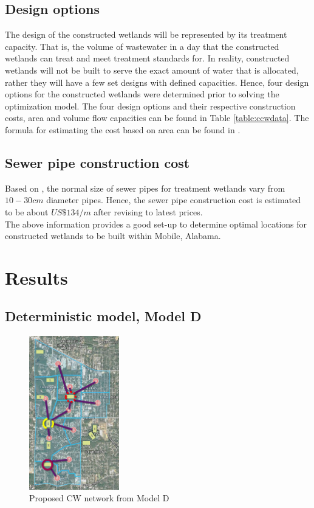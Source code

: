 \documentclass[preprint,12pt,authoryear]{elsarticle}
\begin{document}
\subsection{Design options} 
The design of the constructed wetlands will be represented by its treatment capacity. That is, the volume of wastewater in a day that the constructed wetlands can treat and meet treatment standards for. In reality, constructed wetlands will not be built to serve the exact amount of water that is allocated, rather they will have a few set designs with defined capacities. Hence, four design options for the constructed wetlands were determined prior to solving the optimization model. The four design options and their respective construction costs, area and volume flow capacities can be found in Table \ref{table:ccwdata}. The formula for estimating the cost based on area can be found in \cite{kadlec2009}.

\subsection{Sewer pipe construction cost} 
Based on \cite{kadlec2009}, the normal size of sewer pipes for treatment wetlands vary from $10-30 cm$ diameter pipes. Hence, the sewer pipe construction cost is estimated to be about $US\$134/m$ \citep{usepa2000} after revising to latest prices. \\

The above information provides a good set-up to determine optimal locations for constructed wetlands to be built within Mobile, Alabama. 

\section{Results}
\subsection{Deterministic model, Model D}
\begin{figure}[!htb]
	\centering
	\includegraphics[width=0.35\textwidth]{d.png}
	\caption{Proposed CW network from Model D}
	\label{fig:networkd}
\end{figure}
\end{document}
